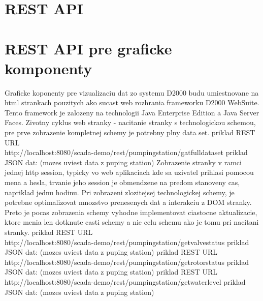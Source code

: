 %
%

\section{REST API}


\section{REST API pre graficke komponenty}
Graficke koponenty pre vizualizaciu dat zo systemu D2000 budu umiestnovane na html strankach pouzitych ako sucast web rozhrania frameworku D2000 WebSuite.
Tento framework je zalozeny na technologii Java Enterprise Edition a Java Server Faces.
Zivotny cyklus web stranky - nacitanie stranky s technologickou schemou, pre prve zobrazenie kompletnej schemy je potrebny plny data set.
priklad REST URL\\ http://localhost:8080/scada-demo/rest/pumpingstation/gatfulldataset
priklad JSON dat: (mozes uviest data z puping station)
Zobrazenie stranky v ramci jednej http session, typicky vo web aplikaciach kde sa uzivatel prihlasi pomocou mena a hesla, trvanie jeho session je obmendzene na predom stanoveny cas, napriklad jednu hodinu.
Pri zobrazeni zlozitejsej technologickej schemy, je potrebne optimalizovat mnozstvo prenesenych dat a interakciu z DOM stranky. Preto je pocas zobrazenia schemy vyhodne implementovat ciastocne aktualizacie, ktore
menia len dotknute casti schemy a nie celu schemu ako je tomu pri nacitani stranky.  
priklad REST URL\\ http://localhost:8080/scada-demo/rest/pumpingstation/getvalvestatus
priklad JSON dat: (mozes uviest data z puping station)
priklad REST URL\\ http://localhost:8080/scada-demo/rest/pumpingstation/getrotorstatus
priklad JSON dat: (mozes uviest data z puping station)
priklad REST URL\\ http://localhost:8080/scada-demo/rest/pumpingstation/getwaterlevel
priklad JSON dat: (mozes uviest data z puping station)


